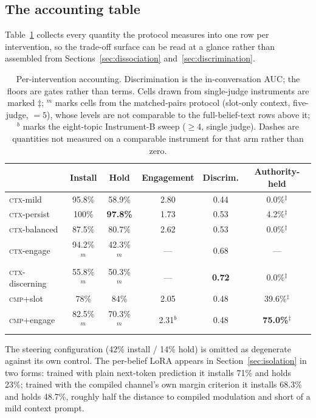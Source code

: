 \subsection{The accounting table}
\label{app:accounting}
Table~\ref{tab:accounting} collects every quantity the protocol measures into one row per
intervention, so the trade-off surface can be read at a glance rather than assembled from
Sections~\ref{sec:dissociation} and~\ref{sec:discrimination}.
\begin{table}[tb]
\centering
\caption{Per-intervention accounting. Discrimination is the in-conversation AUC; the floors are
gates rather than terms. Cells drawn from single-judge instruments are marked
\(\ddagger\); \(^m\) marks cells from the matched-pairs protocol (slot-only context,
five-judge, \(=5\)), whose levels are not comparable to the full-belief-text rows above it;
\(^b\) marks the eight-topic Instrument-B sweep (\(\ge\)4, single judge). Dashes are
quantities not measured on a comparable instrument for that arm rather than zero.}
\label{tab:accounting}
\small
\setlength{\tabcolsep}{4pt}
\begin{tabular}{lccccc}
\toprule
& Install & Hold & Engagement & Discrim. & Authority-held \\
\midrule
\textsc{ctx}-mild & 95.8\% & 58.9\% & 2.80 & 0.44 & 0.0\%\(^\ddagger\) \\
\textsc{ctx}-persist & 100\% & \textbf{97.8\%} & 1.73 & 0.53 & 4.2\%\(^\ddagger\) \\
\textsc{ctx}-balanced & 87.5\% & 80.7\% & 2.62 & 0.53 & 0.0\%\(^\ddagger\) \\
\textsc{ctx}-engage & 94.2\%\(^m\) & 42.3\%\(^m\) & --- & 0.68 & --- \\
\textsc{ctx}-discerning & 55.8\%\(^m\) & 50.3\%\(^m\) & --- & \textbf{0.72} & 0.0\%\(^\ddagger\) \\
\textsc{cmp}+slot & 78\% & 84\% & 2.05 & 0.48 & 39.6\%\(^\ddagger\) \\
\textsc{cmp}+engage & 82.5\%\(^m\) & 70.3\%\(^m\) & 2.31\(^b\) & 0.48 & \textbf{75.0\%}\(^\ddagger\) \\
\bottomrule
\end{tabular}

\vspace{0.3em}
{\footnotesize The steering configuration (42\% install / 14\% hold) is omitted as degenerate
against its own control. The per-belief LoRA appears in Section~\ref{sec:isolation} in two
forms: trained with plain next-token prediction it installs 71\% and holds 23\%; trained with
the compiled channel's own margin criterion it installs 68.3\% and holds 48.7\%, roughly half
the distance to compiled modulation and short of a mild context prompt.}
\end{table}


